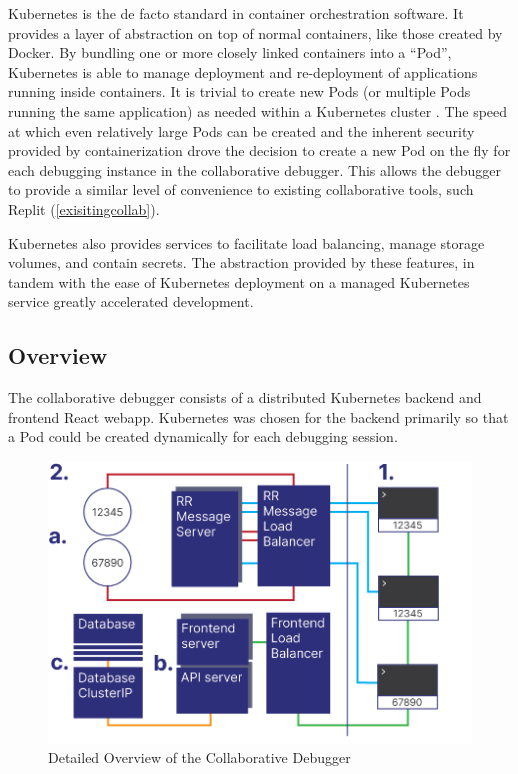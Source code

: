 \documentclass[12pt]{article}
\begin{document}
Kubernetes is the de facto standard in container orchestration
software.  It provides a layer of abstraction on top of normal
containers, like those created by Docker.  By bundling one or more
closely linked containers into a ``Pod'', Kubernetes is able to manage
deployment and re-deployment of applications running inside
containers.  It is trivial to create new Pods (or multiple Pods
running the same application) as needed within a Kubernetes cluster
\cite{k8s}.  The speed at which even relatively large Pods can be
created and the inherent security provided by containerization drove
the decision to create a new Pod on the fly for each debugging
instance in the collaborative debugger.  This allows the debugger to
provide a similar level of convenience to existing collaborative
tools, such Replit (\ref{exisitingcollab}).
\par

Kubernetes also provides services to facilitate load balancing, manage
storage volumes, and contain secrets.  The abstraction provided by
these features, in tandem with the ease of Kubernetes deployment on a
managed Kubernetes service\cite{do_managed_k8s} greatly accelerated
development.

\subsection{Overview}

The collaborative debugger consists of a distributed Kubernetes
backend and frontend React webapp.  Kubernetes was chosen for the
backend primarily so that a Pod could be created dynamically for each
debugging session.  

\begin{figure}[h!]

  \includegraphics[scale=.9]{detailed_system}
  \centering
  \caption{Detailed Overview of the Collaborative Debugger}
  \label{debugger:detailedoverview}
\end{figure}
\end{document}
